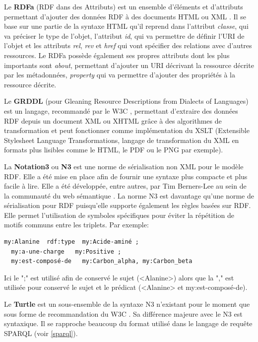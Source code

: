 Le \textbf{RDFa} (RDF dans des Attributs) est un ensemble d'éléments et d'attributs permettant d'ajouter des données RDF à des documents HTML ou XML \cite{adida2008rdfa}. Il se base sur une partie de la syntaxe HTML qu'il reprend dans l'attribut \textit{classe}, qui va préciser le type de l'objet, l'attribut \textit{id}, qui va permettre de définir l'URI de l'objet et les attributs \textit{rel}, \textit{rev} et \textit{href} qui vont spécifier des relations avec d'autres ressources. Le RDFa possède également ses propres attributs dont les plus importants sont \textit{about}, permettant d'ajouter un URI décrivant la ressource décrite par les métadonnées, \textit{property} qui va permettre d'ajouter des propriétés à la ressource décrite.

Le \textbf{GRDDL} (pour Gleaning Resource Descriptions from Dialects of Languages) est un langage, recommandé par le W3C \cite{connolly2007gleaning}, permettant d'extraire des données RDF depuis un document XML ou XHTML grâce à des algorithmes de transformation et peut fonctionner comme implémentation du XSLT (Extensible Stylesheet Language Transformations, langage de transformation du XML en formats plus lisibles comme le HTML, le PDF ou le PNG par exemple).

La \textbf{Notation3} ou \textbf{N3} est une norme de sérialisation non XML pour le modèle RDF. Elle a été mise en place afin de fournir une syntaxe plus compacte et plus facile à lire. Elle a été développée, entre autres, par Tim Berners-Lee au sein de la communauté du web sémantique \cite{berners2008n3logic}. La norme N3 est davantage qu'une norme de sérialisation pour RDF puisqu'elle supporte également les règles basées sur RDF. Elle permet l'utilisation de symboles spécifiques pour éviter la répétition de motifs communs entre les triplets. Par exemple:

\begin{lstlisting}
my:Alanine  rdf:type  my:Acide-aminé ; 
  my:a-une-charge   my:Positive ; 
  my:est-composé-de   my:Carbon_alpha, my:Carbon_beta 
\end{lstlisting} 


Ici le ";" est utilisé afin de conservé le sujet (<Alanine>) alors que la "," est utilisée pour conservé le sujet et le prédicat (<Alanine> et my:est-composé-de).

Le \textbf{Turtle} est un sous-ensemble de la syntaxe N3 n'existant pour le moment que sous forme de recommandation du W3C \cite{prud2013turtle}. Sa différence majeure avec le N3 est syntaxique. Il se rapproche beaucoup du format utilisé dans le langage de requête SPARQL (voir \ref{sparql}).

